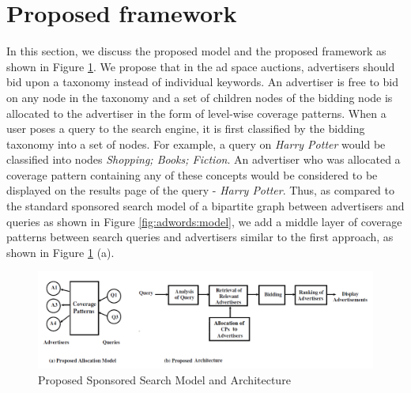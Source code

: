 \section{Proposed framework}

\label{ch5Framework}

In this section, we discuss the proposed model and the proposed framework as shown in Figure \ref{architecture}. We propose that in the ad space auctions, advertisers should bid upon a taxonomy instead of individual keywords. An advertiser is free to bid on any node in the taxonomy and a set of children nodes of the bidding node is allocated to the advertiser in the form of level-wise coverage patterns. When a user poses a query to the search engine, it is first classified by the bidding taxonomy into a set of nodes. For example, a query on \textit{Harry Potter} would be classified into nodes \textit{Shopping; Books; Fiction}. An advertiser who was allocated a coverage pattern containing any of these concepts would be considered to be displayed on the results page of the query - \textit{Harry Potter}. Thus, as compared to the standard sponsored search model of a bipartite graph between advertisers and queries as shown in Figure \ref{fig:adwords:model}, we add a middle layer of coverage patterns between search queries and advertisers similar to the first approach, as shown in Figure \ref{architecture} (a).


\begin{figure}
  \centering
\includegraphics[scale=0.38]{visuals/DASFAAArch.png}
  \caption{Proposed Sponsored Search Model and Architecture}
  \label{architecture}
\end{figure}

